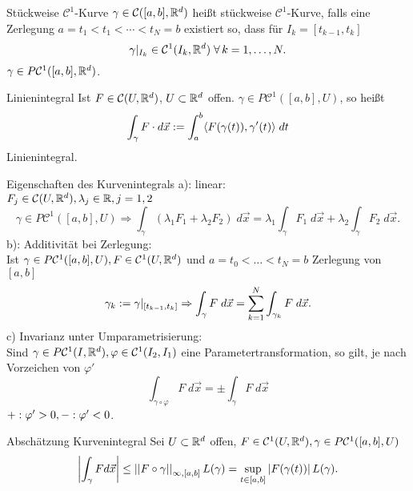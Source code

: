 \documentclass[main.tex]{subfiles}
\begin{document}
\begin{karte}{Stückweise \( \mathcal{C}^1 \)-Kurve}
    \(\gamma \in \mathcal{C}([a,b], \R^d)\) heißt stückweise
    \(\mathcal{C}^1\)-Kurve, falls eine Zerlegung
    \(a = t_1 < t_1 < \cdots < t_N = b\) existiert so, dass
    für \( I_k = [t_{k-1}, t_k]\)
    \[ \gamma \vert_{I_k} \in \mathcal{C}^1(I_k, \R^d) 
    \; \forall k = 1,\ldots,N. \]
    \( \gamma \in P \mathcal{C}^1([a,b], \R^d)\).
\end{karte}

\begin{karte}{Linienintegral}
    Ist \( F \in \mathcal{C}(U, \R^d) \), \(U \subset \R^d\) offen. 
    \( \gamma \in P\mathcal{C}^1([a,b], U) \), so heißt 
    \[ \int_\gamma F\cdot d \vec{x} 
    := \integralx{\scalarprod{ F(\gamma(t)) }{ \gamma'(t) } }{a}{b}{t} \]
    Linienintegral.
\end{karte}

\begin{karte}{Eigenschaften des Kurvenintegrals}
    a): linear: \\
    \( F_j \in \mathcal{C}(U, \R^d), \lambda_j \in \R, j = 1,2 \)
    \[ \gamma \in P\mathcal{C}^1([a,b], U) \Rightarrow 
    \int_\gamma (\lambda_1 F_1 + \lambda_2 F_2)\; d\vec{x} 
    = \lambda_1 \int_\gamma F_1\; d\vec{x} + \lambda_2 \int_\gamma F_2
    \; d\vec{x}. \]
    b): Additivität bei Zerlegung:\\
    Ist \(\gamma \in P\mathcal{C}^1([a,b], U), 
    F \in \mathcal{C}^1(U, \R^d) \)
    und \(a = t_0 < \ldots < t_N = b\) Zerlegung von \([a,b]\)
    \[\gamma_k := \gamma\vert_{[t_{k-1}, t_k]}
    \Rightarrow \integralx{F}{\gamma}{}{\vec{x}}
    = \sum_{k=1}^N\integralx{F}{\gamma_k}{}{\vec{x}}.\]    
    c) Invarianz unter Umparametrisierung:\\
    Sind \(\gamma \in P\mathcal{C}^1(I,\R^d), \varphi \in 
    \mathcal{C}^1(I_2, I_1)\)
    eine Parametertransformation, so gilt, je nach Vorzeichen 
    von \(\varphi'\)
    \[ \int_{\gamma \circ \varphi} F \; d\vec{x} 
    = \pm \int_\gamma F \; d\vec{x} \]
    \(+: \varphi' > 0, \\
    -: \varphi' < 0\).
\end{karte}

\begin{karte}{Abschätzung Kurvenintegral}
    Sei \(U \subset \R^d\) offen, \(F \in \mathcal{C}^1(U, \R^d), \gamma \in P\mathcal{C}^1([a,b], U)\)
    \[ \abs{\int_\gamma F d\vec{x}} \leq \norm{F \circ \gamma}_{\infty,[a,b]} L(\gamma) 
    = \underset{t \in [a,b]}{\sup} \abs{F(\gamma(t))} L(\gamma).\]
\end{karte}
\end{document}
